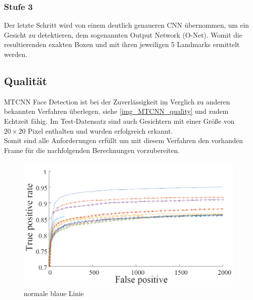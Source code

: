 \subsubsection{Stufe 3}
Der letzte Schritt wird von einem deutlich genaueren CNN übernommen, um ein Gesicht zu detektieren, dem sogenannten Output Network (O-Net). Womit die resultierenden exakten Boxen und mit ihren jeweiligen 5 Landmarks ermittelt werden.
\subsection{Qualität}
MTCNN Face Detection ist bei der Zuverlässigkeit im Verglich zu anderen bekannten Verfahren überlegen, siehe \autoref{img_MTCNN_quality} und zudem Echtzeit fähig. Im Test-Datensatz sind auch Gesichtern mit einer Größe von $20\times 20$ Pixel enthalten und wurden erfolgreich erkannt.\\
Somit sind alle Anforderungen erfüllt um mit diesem Verfahren den vorhanden Frame für die nachfolgenden Berechnungen vorzubereiten.
\begin{figure}
	\centering
	\includegraphics[width=0.5\linewidth]{img/MTCNN_quality}
	\caption{normale blaue Linie\cite{MTCCN}}
	\label{img_MTCNN_quality}
\end{figure}
